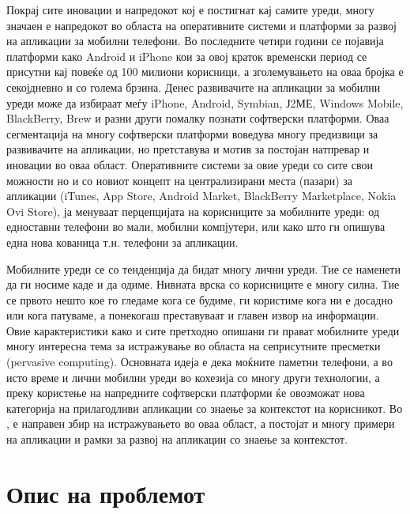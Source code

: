Покрај сите иновации и напредокот кој е постигнат кај самите уреди, многу
значаен е напредокот во областа на оперативните системи и платформи за развој на
апликации за мобилни телефони. Во последните четири години се појавија платформи
како Android и iPhone кои за овој краток временски период се присутни кај повеќе
од 100 милиони корисници, а зголемувањето на оваа бројка е секојдневно и со
голема брзина. Денес развивачите на апликации за мобилни уреди може да избираат
меѓу iPhone, Android, Symbian, Ј2МЕ, Windows Mobile, BlackBerry, Brew и разни
други помалку познати софтверски платформи. Оваа сегментација на многу
софтверски платформи воведува многу предизвици за развивачите на апликации, но
претставува и мотив за постојан натпревар и иновации во оваа област.
Оперативните системи за овие уреди со сите свои можности но и со новиот концепт
на централизирани места (пазари) за апликации (iTunes, App Store, Android
Market, BlackBerry Marketplace, Nokia Ovi Store), ја менуваат перцепцијата на
корисниците за мобилните уреди: од едноставни телефони во мали, мобилни
компјутери, или како што ги опишува една нова кованица т.н. телефони за
апликации.

Мобилните уреди се со тенденција да бидат многу лични уреди. Тие се наменети да
ги носиме каде и да одиме. Нивната врска со корисниците е многу силна. Тие се
првото нешто кое го гледаме кога се будиме, ги користиме кога ни е досадно или
кога патуваме, а понекогаш преставуваат и главен извор на информации. Овие
карактеристики како и сите претходно опишани ги прават мобилните уреди многу
интересна тема за истражување во областа на сеприсутните пресметки (pervasive
computing). Основната идеја е дека моќните паметни телефони, а во исто време и
лични мобилни уреди во кохезија со многу други технологии, а преку користење на
напредните софтверски платформи ќе овозможат нова категорија на прилагодливи
апликации со знаење за контекстот на корисникот. Во
\cite{chen2000survey,baldauf2007survey}, е направен збир на истражувањето во
оваа област, а постојат и многу примери на апликации  и рамки за развој на
апликации со знаење за контекстот.


\section{Опис на проблемот}

